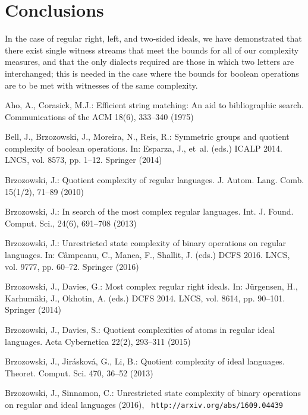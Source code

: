 \documentclass[final]{dmtcs-episciences}
\theoremstyle{definition}
\theoremstyle{remark}
\begin{document}
\section{Conclusions}
In the case of regular right, left, and two-sided ideals,
we have demonstrated that there exist  single witness streams that meet the bounds for all of our complexity measures, and that the only dialects required are those in which two  letters are interchanged; this is needed in the case where the bounds for boolean operations are to be met with witnesses of the same complexity.
\providecommand{\noopsort}[1]{}
\begin{thebibliography}{10}
\providecommand{\url}[1]{\texttt{#1}}
\providecommand{\urlprefix}{URL }

Aho, A., Corasick, M.J.: Efficient string matching: An aid to bibliographic
  search. Communications of the ACM  18(6),  333--340 (1975)

Bell, J., Brzozowski, J., Moreira, N., Reis, R.: Symmetric groups and quotient
  complexity of boolean operations. In: Esparza, J., et~al. (eds.) ICALP 2014.
  LNCS, vol. 8573, pp. 1--12. Springer (2014)

Brzozowski, J.: Quotient complexity of regular languages. J. Autom. Lang. Comb.
   15(1/2),  71--89 (2010)

Brzozowski, J.: In search of the most complex regular languages. Int. J. Found.
  Comput. Sci.,  24(6),  691--708 (2013)

Brzozowski, J.: Unrestricted state complexity of binary operations on regular
  languages. In: C{\^a}mpeanu, C., Manea, F., Shallit, J. (eds.) DCFS 2016.
  LNCS, vol. 9777, pp. 60--72. Springer (2016)

Brzozowski, J., Davies, G.: Most complex regular right ideals. In: J\"urgensen,
  H., Karhum\"aki, J., Okhotin, A. (eds.) DCFS 2014. LNCS, vol. 8614, pp.
  90--101. Springer (2014)

Brzozowski, J., Davies, S.: Quotient complexities of atoms in regular ideal
  languages. Acta Cybernetica  22(2),  293--311 (2015)

Brzozowski, J., Jir{\'a}skov{\'a}, G., Li, B.: Quotient complexity of ideal
  languages. Theoret. Comput. Sci.  470,  36--52 (2013)

Brzozowski, J., Sinnamon, C.: Unrestricted state complexity of binary
  operations on regular and ideal languages (2016), {\small\tt
  http://arxiv.org/abs/1609.04439}


\end{thebibliography}
\end{document}
